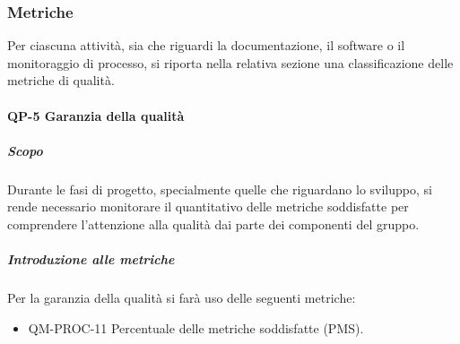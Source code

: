 	\subsubsection{Metriche}

		Per ciascuna attività, sia che riguardi la documentazione, il software o il monitoraggio di processo, si riporta nella relativa sezione una classificazione delle metriche di qualità. 

		\paragraph{QP-5 Garanzia della qualità}

        \subparagraph{Scopo}

            Durante le fasi di progetto, specialmente quelle che riguardano lo sviluppo, si rende necessario monitorare il quantitativo delle metriche soddisfatte per comprendere l'attenzione alla qualità dai parte dei componenti del gruppo.

        \subparagraph{Introduzione alle metriche}

        	Per la garanzia della qualità si farà uso delle seguenti metriche:

            \begin{itemize}
                \item QM-PROC-11 Percentuale delle metriche soddisfatte (PMS).
            \end{itemize}

